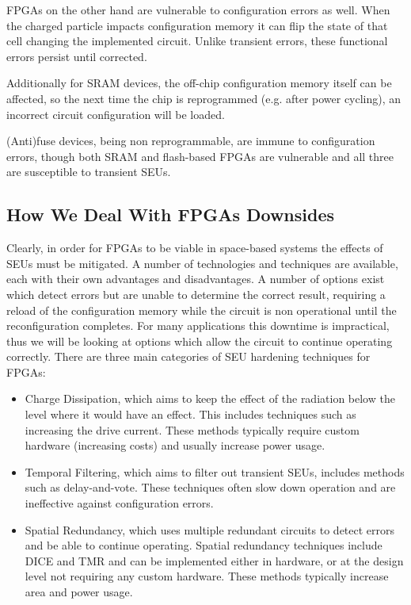 \documentclass[12pt,final,oneside]{dwThesis} %
\begin{document}
   \glspl{FPGA} on the other hand are vulnerable to configuration errors as well. When the charged particle impacts configuration memory it can flip the state of that cell changing the implemented circuit. Unlike transient errors, these functional errors persist until corrected.

   Additionally for \gls{SRAM} devices, the off-chip configuration memory itself can be affected, so the next time the chip is reprogrammed (e.g. after power cycling), an incorrect circuit configuration will be loaded.

   (Anti)fuse devices, being non reprogrammable, are immune to configuration errors, though both \gls{SRAM} and flash-based \glspl{FPGA} are vulnerable and all three are susceptible to transient \glspl{SEU}\cite{HFPP}.

   \subsection{How We Deal With \glspl{FPGA} Downsides}
   Clearly, in order for \glspl{FPGA} to be viable in space-based systems the effects of \glspl{SEU} must be mitigated. A number of technologies and techniques are available, each with their own advantages and disadvantages. A number of options exist which detect errors but are unable to determine the correct result, requiring a reload of the configuration memory while the circuit is non operational until the reconfiguration completes. For many applications this downtime is impractical, thus we will be looking at options which allow the circuit to continue operating correctly.
   There are three main categories of \gls{SEU} hardening techniques for \glspl{FPGA}\cite{HardeningTechniques}:
   \begin{itemize}
      \item Charge Dissipation, which aims to keep the effect of the radiation below the level where it would have an effect. This includes techniques such as increasing the drive current. These methods typically require custom hardware (increasing costs) and usually increase power usage.
      \item Temporal Filtering, which aims to filter out transient \glspl{SEU}, includes methods such as delay-and-vote\cite{HardeningTechniques}. These techniques often slow down operation and are ineffective against configuration errors.
      \item Spatial Redundancy, which uses multiple redundant circuits to detect errors and be able to continue operating. Spatial redundancy techniques include \gls{DICE}\cite{DICE} and \gls{TMR} and can be implemented either in hardware, or at the design level not requiring any custom hardware. These methods typically increase area and power usage.
   \end{itemize}
\end{document}
